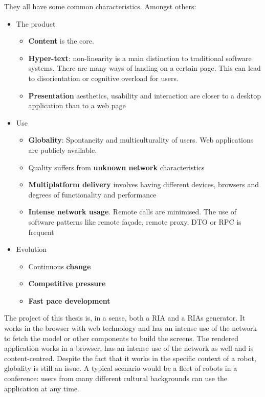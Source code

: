 They all have some common characteristics. 
Amongst others:
\begin{itemize}
    \item The product
    \begin{itemize}
        \item \textbf{Content} is the core.
        \item \textbf{Hyper-text}: non-linearity is a main distinction to traditional software systems. There are many ways of landing on a certain page. This can lead to disorientation or cognitive overload for users.
        \item \textbf{Presentation} aesthetics, usability and interaction are closer to a desktop application than to a web page
    \end{itemize}
    \item Use
    \begin{itemize}
        \item \textbf{Globality}: Spontaneity and multiculturality of users. Web applications are publicly available.
        \item Quality suffers from \textbf{unknown network} characteristics
        \item \textbf{Multiplatform delivery} involves having different devices, browsers and degrees of functionality and performance
        \item \textbf{Intense network usage}. Remote calls are minimised. The use of software patterns like remote fa\c{c}ade, remote proxy, \ac{DTO} or \ac{RPC} is frequent
    \end{itemize}
    \item Evolution
    \begin{itemize}
         \item Continuous \textbf{change}
         \item \textbf{Competitive pressure}
         \item \textbf{Fast pace development}
    \end{itemize}   
\end{itemize}

The project of this thesis is, in a sense, both a \ac{RIA} and a \acp{RIA} generator. 
It works in the browser with web technology and has an intense use of the network to fetch the model or other components to build the screens.
The rendered application works in a browser, has an intense use of the network as well and is content-centred.
Despite the fact that it works in the specific context of a robot, globality is still an issue.
A typical scenario would be a fleet of robots in a conference: users from many different cultural backgrounds can use the application at any time.


